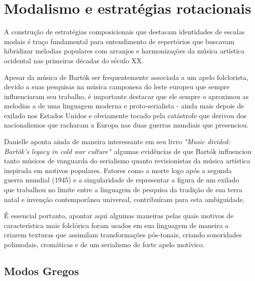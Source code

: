 \documentclass[
	12pt,				%
	openright,			%
	twoside,			%
	a4paper,			%
	english,			%
	french,				%
	spanish,			%
	brazil				%
	]{abntex2}
\begin{document}


\section{Modalismo e estratégias rotacionais}
\label{modalismo}

A construção de estratégias composicionais que destacam identidades de escalas modais é traço fundamental para entendimento de repertórios que buscavam hibridizar melodias populares com arranjos e harmonizações da música artística ocidental nas primeiras décadas do século XX. 

Apesar da música de Bartók ser frequentemente associada a um apelo folclorista, devido a suas pesquisas na música camponesa do leste europeu que sempre influenciaram seu trabalho, é importante destacar que ele sempre o aproximou as melodias a de uma linguagem moderna e proto-serialista - ainda mais depois de exilado nos Estados Unidos e obviamente tocado pela catástrofe que derivou dos nacionalismos que racharam a Europa nas duas guerras mundiais que presenciou.

Danielle  aponta ainda de maneira interessante em seu livro \textit{"Music divided: Bartók's legacy in cold war culture"}\ algumas evidências de que Bartók influenciou tanto músicos de vanguarda do serialismo quanto revisionistas da música artística inspirada em motivos populares. Fatores como a morte logo após a segunda guerra mundial (1945) e a singularidade de representar a figura de um exilado que trabalhou no limite entre a linguagem de pesquisa da tradição de sua terra natal e invenção contemporânea universal, contribuíram para esta ambiguidade.

É essencial portanto, apontar aqui algumas maneiras pelas quais motivos de característica mais folclórica foram usados em sua linguagem de maneira a criarem texturas que assimilam transformações pós-tonais, criando sonoridades polimodais, cromáticas e de um serialismo de forte apelo motívico.

\subsection{Modos Gregos}
\end{document}

